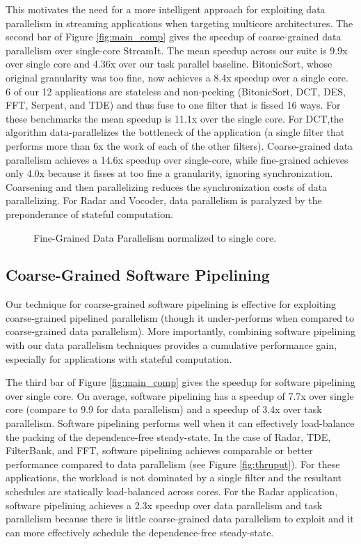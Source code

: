 This motivates the need for a more intelligent approach for exploiting
data parallelism in streaming applications when targeting multicore
architectures.  The second bar of Figure \ref{fig:main_comp} gives the
speedup of coarse-grained data parallelism over single-core
StreamIt. The mean speedup across our suite is 9.9x over single core
and 4.36x over our task parallel baseline.  BitonicSort, whose
original granularity was too fine, now achieves a 8.4x speedup over a
single core. 6 of our 12 applications are stateless and non-peeking
(BitonicSort, DCT, DES, FFT, Serpent, and TDE) and thus fuse to one
filter that is fissed 16 ways.  For these benchmarks the mean speedup
is 11.1x over the single core.  For DCT,the algorithm
data-parallelizes the bottleneck of the application (a single filter
that performs more than 6x the work of each of the other filters).
Coarse-grained data parallelism achieves a 14.6x speedup over
single-core, while fine-grained achieves only 4.0x because it fisses
at too fine a granularity, ignoring synchronization.  Coarsening and
then parallelizing reduces the synchronization costs of data
parallelizing.  For Radar and Vocoder, data parallelism is paralyzed
by the preponderance of stateful computation.

\begin{figure}[t]
\centering
{}
\caption{Fine-Grained Data Parallelism normalized to single core.
\protect\label{fig:fine_data}}
\vspace{-6pt}
\end{figure}

\subsection{Coarse-Grained Software Pipelining}

Our technique for coarse-grained software pipelining is effective for
exploiting coarse-grained pipelined parallelism (though it
under-performs when compared to coarse-grained data parallelism).
More importantly, combining software pipelining with our data
parallelism techniques provides a cumulative performance gain,
especially for applications with stateful computation.

The third bar of Figure \ref{fig:main_comp} gives the speedup for
software pipelining over single core.  On average, software pipelining
has a speedup of 7.7x over single core (compare to 9.9 for data
parallelism) and a speedup of 3.4x over task parallelism. Software
pipelining performs well when it can effectively load-balance the
packing of the dependence-free steady-state.  In the case of Radar,
TDE, FilterBank, and FFT, software pipelining achieves comparable or
better performance compared to data parallelism (see Figure
\ref{fig:thruput}).  For these applications, the workload is not
dominated by a single filter and the resultant schedules are
statically load-balanced across cores.  For the Radar application,
software pipelining achieves a 2.3x speedup over data parallelism and
task parallelism because there is little coarse-grained data
parallelism to exploit and it can more effectively schedule the
dependence-free steady-state.

